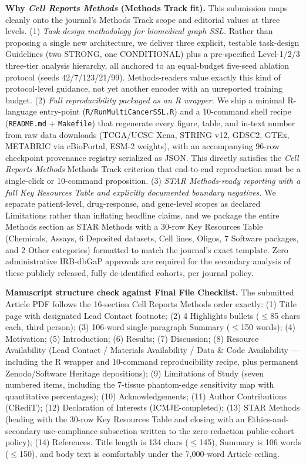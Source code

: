 \documentclass[11pt,a4paper]{article}
\begin{document}
\textbf{Why \textit{Cell Reports Methods} (Methods Track fit).} This submission maps cleanly onto the journal's Methods Track scope and editorial values at three levels. (1) \textit{Task-design methodology for biomedical graph SSL.} Rather than proposing a single new architecture, we deliver three explicit, testable task-design Guidelines (two STRONG, one CONDITIONAL) plus a pre-specified Level-1/2/3 three-tier analysis hierarchy, all anchored to an equal-budget five-seed ablation protocol (seeds 42/7/123/21/99). Methods-readers value exactly this kind of protocol-level guidance, not yet another encoder with an unreported training budget. (2) \textit{Full reproducibility packaged as an R wrapper.} We ship a minimal R-language entry-point (\texttt{R/RunMultiCancerSSL.R}) and a 10-command shell recipe (\texttt{README.md} + \texttt{Makefile}) that regenerate every figure, table, and in-text number from raw data downloads (TCGA/UCSC Xena, STRING v12, GDSC2, GTEx, METABRIC via cBioPortal, ESM-2 weights), with an accompanying 96-row checkpoint provenance registry serialized as JSON. This directly satisfies the \textit{Cell Reports Methods} Methods Track criterion that end-to-end reproduction must be a single-click or 10-command proposition. (3) \textit{STAR Methods-ready reporting with a full Key Resources Table and explicitly documented boundary negatives.} We separate patient-level, drug-response, and gene-level scopes as declared Limitations rather than inflating headline claims, and we package the entire Methods section as STAR Methods with a 30-row Key Resources Table (Chemicals, Assays, 6 Deposited datasets, Cell lines, Oligos, 7 Software packages, and 2 Other categories) formatted to match the journal's exact template. Zero administrative IRB-dbGaP approvals are required for the secondary analysis of these publicly released, fully de-identified cohorts, per journal policy.

\textbf{Manuscript structure check against Final File Checklist.} The submitted Article PDF follows the 16-section Cell Reports Methods order exactly: (1) Title page with designated Lead Contact footnote; (2) 4 Highlights bullets ($\le$85 chars each, third person); (3) 106-word single-paragraph Summary ($\le$150 words); (4) Motivation; (5) Introduction; (6) Results; (7) Discussion; (8) Resource Availability (Lead Contact / Materials Availability / Data \& Code Availability --- including the R wrapper and 10-command reproducibility recipe, plus permanent Zenodo/Software Heritage depositions); (9) Limitations of Study (seven numbered items, including the 7-tissue phantom-edge sensitivity map with quantitative percentages); (10) Acknowledgements; (11) Author Contributions (CRediT); (12) Declaration of Interests (ICMJE-completed); (13) STAR Methods (leading with the 30-row Key Resources Table and closing with an Ethics-and-secondary-use-compliance subsection written to the zero-redaction public-cohort policy); (14) References. Title length is 134 chars ($\le$145), Summary is 106 words ($\le$150), and body text is comfortably under the 7,000-word Article ceiling.
\end{document}
